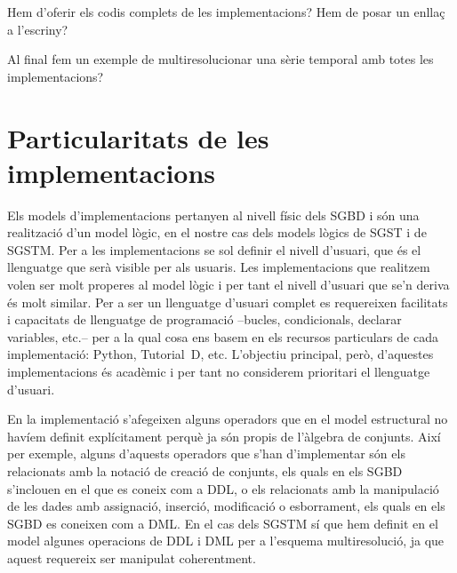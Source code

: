   Hem d'oferir els codis complets de les implementacions?
Hem de posar un enllaç a l'escriny?


 Al final fem un exemple de multiresolucionar una sèrie temporal amb totes les implementacions?







\section{Particularitats de les implementacions}



Els models d'implementacions pertanyen al nivell físic dels \gls{SGBD}
i són una realització d'un model lògic, en el nostre cas dels models
lògics de \gls{SGST} i de \gls{SGSTM}. Per a les implementacions se
sol definir el nivell d'usuari, que és el llenguatge que serà visible
per als usuaris. Les implementacions que realitzem volen ser molt
properes al model lògic i per tant el nivell d'usuari que se'n deriva
és molt similar. Per a ser un llenguatge d'usuari complet es
requereixen facilitats i capacitats de llenguatge de programació
--bucles, condicionals, declarar variables, etc.-- per a la qual
cosa ens basem en els recursos particulars de cada implementació:
Python, Tutorial~D, etc. L'objectiu principal, però, d'aquestes
implementacions és acadèmic i per tant no considerem prioritari el
llenguatge d'usuari.




En la implementació s'afegeixen alguns operadors que en el model
estructural no havíem definit explícitament perquè ja són propis de
l'àlgebra de conjunts. Així per exemple, alguns d'aquests operadors
que s'han d'implementar són els relacionats amb la notació de creació
de conjunts, %
els quals en els \gls{SGBD} s'inclouen en el que es coneix com a
\gls{DDL}, o els relacionats amb la manipulació de les dades amb
assignació, inserció, modificació o esborrament, els quals en els
\gls{SGBD} es coneixen com a \gls{DML}.  En el cas dels \gls{SGSTM} sí
que hem definit en el model algunes operacions de \gls{DDL} i \gls{DML} per a
l'esquema multiresolució, ja que aquest requereix ser manipulat
coherentment.













